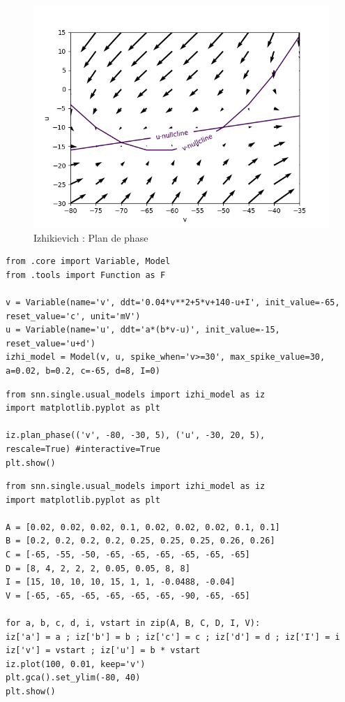 \documentclass[12pt]{scrartcl}
\begin{document}
\begin{figure}[!h]
\centering
\includegraphics[scale=0.8]{imgs/izPDP.png}
\caption{ Izhikievich : Plan de phase}
\label{izPDP}
\end{figure}
\clearpage
\begin{lstlisting}[caption = {Izhikievich : Définition du modèle}]
from .core import Variable, Model
from .tools import Function as F

v = Variable(name='v', ddt='0.04*v**2+5*v+140-u+I', init_value=-65, 
reset_value='c', unit='mV')
u = Variable(name='u', ddt='a*(b*v-u)', init_value=-15,
reset_value='u+d')
izhi_model = Model(v, u, spike_when='v>=30', max_spike_value=30, 
a=0.02, b=0.2, c=-65, d=8, I=0) 
\end{lstlisting}

\begin{lstlisting}[caption = {Izhikievich : Plan de phase}]
from snn.single.usual_models import izhi_model as iz
import matplotlib.pyplot as plt

iz.plan_phase(('v', -80, -30, 5), ('u', -30, 20, 5), 
rescale=True) #interactive=True
plt.show()
\end{lstlisting}

\begin{lstlisting}[caption = {Izhikievich : Evolution du potentiel de membrane en fonction du temps pour plusieurs ensembles de paramètres}]
from snn.single.usual_models import izhi_model as iz
import matplotlib.pyplot as plt

A = [0.02, 0.02, 0.02, 0.1, 0.02, 0.02, 0.02, 0.1, 0.1]
B = [0.2, 0.2, 0.2, 0.2, 0.25, 0.25, 0.25, 0.26, 0.26]
C = [-65, -55, -50, -65, -65, -65, -65, -65, -65]
D = [8, 4, 2, 2, 2, 0.05, 0.05, 8, 8]
I = [15, 10, 10, 10, 15, 1, 1, -0.0488, -0.04]
V = [-65, -65, -65, -65, -65, -65, -90, -65, -65]

for a, b, c, d, i, vstart in zip(A, B, C, D, I, V):
iz['a'] = a ; iz['b'] = b ; iz['c'] = c ; iz['d'] = d ; iz['I'] = i
iz['v'] = vstart ; iz['u'] = b * vstart
iz.plot(100, 0.01, keep='v')
plt.gca().set_ylim(-80, 40)
plt.show()
\end{lstlisting}
\end{document}
